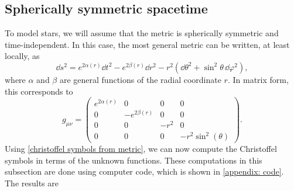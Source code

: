 \subsection{Spherically symmetric spacetime}

To model stars, we will assume that the metric is spherically symmetric and time-independent.
In this case, the most general metric can be written, at least locally, as~\autocite{carrollSpacetimeGeometryIntroduction2019}
%
\begin{equation}
    \dd s^2 
    = e^{2\alpha(r)} \dd t^2 - e^{2 \beta(r)} \dd r^2 - 
    r^2 (\dd \theta^2 + \sin^2 \theta \, \dd \varphi^2),
\end{equation}
%
where $\alpha$ and $\beta$ are general functions of the radial coordinate $r$.
In matrix form, this corresponds to 
%
\begin{equation}
    \label{spherically symmetric metric}
    g_{\mu \nu} =
    \left(
        \begin{matrix}
            e^{2 \alpha{\left(r \right)}} & 0 & 0 & 0\\
            0 & - e^{2 \beta{\left(r \right)}} & 0 & 0
            \\0 & 0 & - r^{2} & 0
            \\0 & 0 & 0 & - r^{2} \sin^{2}{\left(\theta \right)}
        \end{matrix}
     \right).
\end{equation}
%
Using \autoref{christoffel symbols from metric}, we can now compute the Christoffel symbols in terms of the unknown functions.
These computations in this subsection are done using computer code, which is shown in \autoref{appendix: code}.
The results are
%
